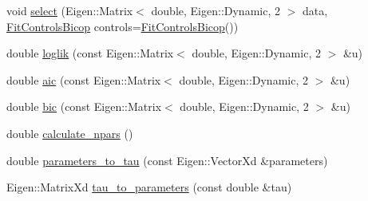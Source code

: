 \begin{DoxyCompactItemize}
\item 
void \hyperlink{classvinecopulib_1_1_bicop_af20af5c3ba6565628987b4784e9ac348}{select} (Eigen\+::\+Matrix$<$ double, Eigen\+::\+Dynamic, 2 $>$ data, \hyperlink{classvinecopulib_1_1_fit_controls_bicop}{Fit\+Controls\+Bicop} controls=\hyperlink{classvinecopulib_1_1_fit_controls_bicop}{Fit\+Controls\+Bicop}())
\item 
double \hyperlink{classvinecopulib_1_1_bicop_ae8bcc0c3265cc86565333a0cfd3d619d}{loglik} (const Eigen\+::\+Matrix$<$ double, Eigen\+::\+Dynamic, 2 $>$ \&u)
\item 
double \hyperlink{classvinecopulib_1_1_bicop_a9287fec95519fea64a2ae80f5888c709}{aic} (const Eigen\+::\+Matrix$<$ double, Eigen\+::\+Dynamic, 2 $>$ \&u)
\item 
double \hyperlink{classvinecopulib_1_1_bicop_ac1f480d13b3464260c2dd6aa88b2e130}{bic} (const Eigen\+::\+Matrix$<$ double, Eigen\+::\+Dynamic, 2 $>$ \&u)
\item 
double \hyperlink{classvinecopulib_1_1_bicop_a9f3b3b83c54a9e1d809fdee058f3eb11}{calculate\+\_\+npars} ()
\item 
double \hyperlink{classvinecopulib_1_1_bicop_aa25436353dee76e4368fb941a7efa257}{parameters\+\_\+to\+\_\+tau} (const Eigen\+::\+Vector\+Xd \&parameters)
\item 
Eigen\+::\+Matrix\+Xd \hyperlink{classvinecopulib_1_1_bicop_a5809ddc9884f6fb66fe53289be348913}{tau\+\_\+to\+\_\+parameters} (const double \&tau)
\end{DoxyCompactItemize}
